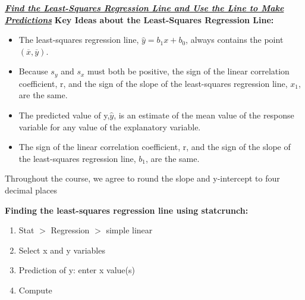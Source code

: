 \documentclass{report}
\begin{document}
    \bigbreak \noindent \bigbreak \noindent 
    \textbf{\textit{\underline{Find the Least-Squares Regression Line and Use the Line to Make Predictions}}}
    \bigbreak \noindent 
    \textbf{Key Ideas about the Least-Squares Regression Line:}
    \bigbreak \noindent 
    \begin{itemize}
        \item The least-squares regression line, $\hat{y}=b_{1}x+b_{0}$, always contains the point $(\overline{x}, \overline{y})$.
        \item Because $s_{y}$ and $s_{x}$  must both be positive, the sign of the linear correlation coefficient, r, and the sign of the slope of the least-squares regression line, $x_{1}$, are the same.
        \item The predicted value of y,$\hat{y} $, is an estimate of the mean value of the response variable for any value of the explanatory variable.
        \item The sign of the linear correlation​ coefficient, r, and the sign of the slope of the​ least-squares regression​ line, $b_{1} $ ​, are the same. 
    \end{itemize}
    \bigbreak \noindent 
    Throughout the course, we agree to round the slope and y-intercept to four decimal places

    \pagebreak \bigbreak \noindent
    \textbf{Finding the least-squares regression line using statcrunch:}
    \bigbreak \noindent 
    \begin{enumerate}
        \item Stat $> $ Regression $>  $ simple linear
        \item Select x and y variables
        \item Prediction of y: enter x value(s)
        \item Compute
    \end{enumerate}
\end{document}
